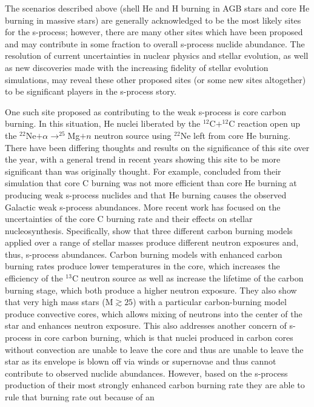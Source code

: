 The scenarios described above (shell He and H burning in AGB stars and
core He burning in massive stars) are generally acknowledged to be the
most likely sites for the s-process; however, there are many other
sites which have been proposed and may contribute in some fraction to
overall s-process nuclide abundance.  The resolution of current
uncertainties in nuclear physics and stellar evolution, as well as new
discoveries made with the increasing fidelity of stellar evolution
simulations, may reveal these other proposed sites (or some new sites
altogether) to be significant players in the s-process story.

One such site proposed as contributing to the weak s-process 
is core carbon burning.  In this situation, He nuclei liberated by the
$^{12}$C$+^{12}$C reaction open up the $^{22}$Ne$+ \alpha \rightarrow
^{25}$Mg$+n$ neutron source using $^{22}$Ne left from core He
burning. There have been differing thoughts and results on the
significance of this site over the year, with a general trend in
recent years showing this site to be more significant than was
originally thought.  For example, \cite{arcoragi1991} concluded from their
simulation that core C burning was not more efficient than core
He burning at producing weak s-process nuclides and that He burning
causes the observed Galactic weak s-process abundances.  More recent
work has focused on the uncertainties of the core C burning rate and
their effects on stellar nucleosynthesis.  Specifically, \cite{bennettetal2012}
show that three different carbon burning models applied over a range
of stellar masses produce different
neutron exposures and, thus, s-process abundances.  Carbon burning
models with enhanced carbon burning rates produce lower temperatures
in the core, which
increases the efficiency of the $^{13}$C
neutron source as well as increase the lifetime of the carbon burning
stage, which both produce a higher neutron exposure.  They also show that very
high mass stars (M$\gtrsim25$\Msol) with a particular carbon-burning
model produce convective cores, which allows mixing of neutrons into
the center of the star and enhances neutron exposure.  This also
addresses another concern of s-process in core carbon burning, which
is that nuclei produced in carbon cores without convection are unable
to leave the core and thus are unable to leave the star as its
envelope is blown off via winds or supernovae and thus cannot
contribute to observed nuclide abundances.  However, based on the
s-process production of their most strongly enhanced carbon burning
rate they are able to rule that burning rate out because of an
